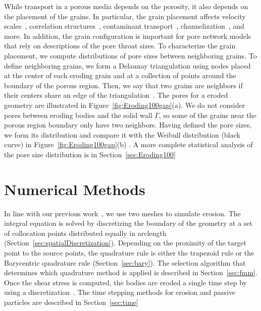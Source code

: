 \documentclass[preprint,10pt]{elsarticle}
\begin{document}
While transport in a porous media depends on the porosity, it also
depends on the placement of the grains.  In particular, the grain
placement affects velocity scales~\cite{ali-par-wei-bre2017},
correlation structures~\cite{leb-ded-dav-bou2007}, contaminant
transport~\cite{knu-car2005},
channelization~\cite{sie-ili-pri-riv-gua2019,berhanu2012shape}, and
more. In addition, the grain configuration is important for pore network
models~\cite{bry-kin-mel1993, bry-mel-cad1993, bij-blu2006} that rely on
descriptions of the pore throat sizes. To characterize the grain
placement, we compute distributions of pore sizes between neighboring
grains.  To define neighboring grains, we form a Delaunay triangulation
using nodes placed at the center of each eroding grain and at a
collection of points around the boundary of the porous region.  Then, we
say that two grains are neighbors if their centers share an edge of the
triangulation~\cite{dea-qua-bir-jua2018}. The pores for a eroded
geometry are illustrated in Figure~\ref{fig:Eroding100gap}(a). We do not
consider pores between eroding bodies and the solid wall $\Gamma$, so
some of the grains near the porous region boundary only have two
neighbors. Having defined the pore sizes, we form its distribution and
compare it with the Weibull distribution (black curve) in
Figure~\ref{fig:Eroding100gap}(b) . A more complete statistical analysis
of the pore size distribution is in Section~\ref{sec:Eroding100}

\section{Numerical Methods}
\label{sec:method}
In line with our previous work~\cite{qua-moo2018}, we use two meshes to
simulate erosion. The integral equation is solved by discretizing the
boundary of the geometry at a set of collocation points distributed
equally in arclength (Section~\ref{sec:spatialDiscretization}).
Depending on the proximity of the target point to the source points, the
quadrature rule is either the trapezoid rule or the Barycentric
quadrature rule (Section~\ref{sec:bary}).  The selection algorithm that
determines which quadrature method is applied is described in
Section~\ref{sec:fmm}.  Once the shear stress is computed, the bodies
are eroded a single time step by using a {\thL}
discretization~\cite{hou-low-she1994, moore2013self}.  The time stepping methods for
erosion and passive particles are described in Section~\ref{sec:time}
\end{document}

